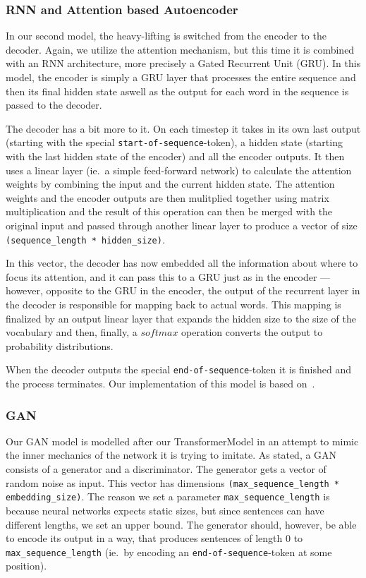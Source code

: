 \documentclass{article}
\begin{document}
\subsubsection{RNN and Attention based Autoencoder}\label{sec:attnRNN}

In our second model, the heavy-lifting is switched from the encoder to the
decoder. Again, we utilize the attention mechanism, but this time it is combined
with an RNN architecture, more precisely a Gated Recurrent Unit (GRU). In this
model, the encoder is simply a GRU layer that processes the entire sequence and
then its final hidden state aswell as the output for each word in the sequence
is passed to the decoder.

The decoder has a bit more to it. On each timestep it takes in its own last
output (starting with the special \texttt{start-of-sequence}-token), a hidden
state (starting with the last hidden state of the encoder) and all the encoder
outputs. It then uses a linear layer (ie.\ a simple feed-forward network) to
calculate the attention weights by combining the input and the current hidden
state. The attention weights and the encoder outputs are then mulitplied
together using matrix multiplication and the result of this operation can then be
merged with the original input and passed through another linear layer to
produce a vector of size \texttt{(sequence\_length * hidden\_size)}.

In this vector, the decoder has now embedded all the information about where to
focus its attention, and it can pass this to a GRU just as in the encoder ---
however, opposite to the GRU in the encoder, the output of the recurrent layer
in the decoder is responsible for mapping back to actual words. This mapping is
finalized by an output linear layer that expands the hidden size to the size of
the vocabulary and then, finally, a $softmax$ operation converts the output to
probability distributions.

When the decoder outputs the special \texttt{end-of-sequence}-token it is
finished and the process terminates. Our implementation of this model is based
on~\cite{pytorchTutorialAtt}.


\subsubsection{GAN}\label{sec:modelGAN}

Our GAN model is modelled after our TransformerModel in an attempt to mimic the
inner mechanics of the network it is trying to imitate. As stated, a GAN
consists of a generator and a discriminator. The generator gets a vector of
random noise as input. This vector has dimensions \texttt{(max\_sequence\_length
* embedding\_size)}. The reason we set a parameter
\texttt{max\_sequence\_length} is because neural networks expects static sizes,
but since sentences can have different lengths, we set an upper bound. The
generator should, however, be able to encode its output in a way, that produces
sentences of length 0 to \texttt{max\_sequence\_length} (ie.\ by encoding an
\texttt{end-of-sequence}-token at some position).
\end{document}
